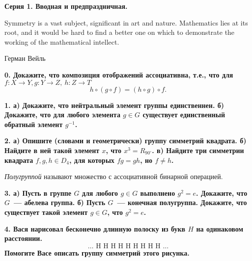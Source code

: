 \documentclass[12pt]{article}
\begin{document}
\centerline{\bf{Серия 1. Вводная и предпраздничная. }}

	\epigraph{Symmetry is a vast subject, significant in art and nature. Mathematics lies at its root, and it would be hard to find a better one on which to demonstrate the working of the mathematical intellect.}{Герман Вейль}

	\bf{0.} Докажите, что композиция отображений ассоциативна, т.е., что для $f \colon X \to Y, g \colon Y \to Z, \ h \colon Z \to T$
	\[
		h \circ (g \circ f) = (h \circ g) \circ f.
	\]

	\bf{1.} а) Докажите, что нейтральный элемент группы единственнен. б) Докажите, что для любого элемента $g \in G$ существует единственный обратный элемент $g^{-1}$. 

	\bf{2.} а) Опишите (словами и геометрически) группу симметрий квадрата. б) Найдите в ней такой элемент $x$, что $x^3 = R_{90^{\circ}}$. в) Найдите три симметрии квадрата $f, g, h \in D_{4}$, для которых $fg = gh$, но $f \neq h$.

	\begin{definition} 
		\emph{Полугруппой} называют множество с ассоциативной бинарной операцией. 
	\end{definition}

	\bf{3.} а)  Пусть в группе $G$ для любого $g \in G$ выполнено $g^2 = e$. Докажите, что $G$~--- абелева группа.  б) Пусть $G$~--- конечная полугруппа. Докажите, что существует такой элемент $g \in G$, что $g^2 = e$.

	\bf{4.} Вася нарисовал бесконечно длинную полоску из букв $H$ на одинаковом расстоянии.
	\[
		\text{\ldots\  H \ H \ H \ H \ H \ H \ H \ H \ H \ldots}
	\]
	Помогите Васе описать группу симметрий этого рисунка. 



	
\end{document}
